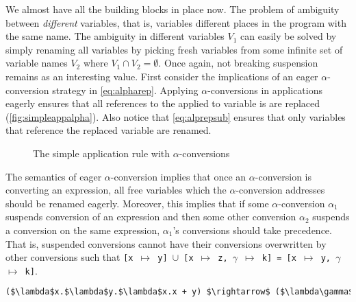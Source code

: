 \documentclass[11pt,oneside,a4paper]{report}
\begin{document}
We almost have all the building blocks in place now.
The problem of ambiguity between \textit{different} variables, that is, variables different places in the program with the same name.
The ambiguity in different variables $V_1$ can easily be solved by simply renaming all variables by picking fresh variables from some infinite set of variable names $V_2$ where $V_1 \cap V_2 = \emptyset$.
Once again, not breaking suspension remains as an interesting value.
First consider the implications of an eager $\alpha$-conversion strategy in \autoref{eq:alpharep}.
Applying $\alpha$-conversions in applications eagerly ensures that all references to the applied to variable is are replaced (\autoref{fig:simpleappalpha}).
Also notice that \autoref{eq:alprepsub} ensures that only variables that reference the replaced variable are renamed.
\begin{figure}[ht]
    \begin{mdframed}[style=style1]
        \vspace*{0.4cm}
          \begin{prooftree}
          \end{prooftree}   
    \end{mdframed}
    \caption{The simple application rule with $\alpha$-conversions}
    \label{fig:simpleappalpha}
\end{figure}
The semantics of eager $\alpha$-conversion implies that once an $\alpha$-conversion is converting an expression, all free variables which the $\alpha$-conversion addresses should be renamed eagerly.
Moreover, this implies that if some $\alpha$-conversion $\alpha_1$ suspends conversion of an expression and then some other conversion $\alpha_2$ suspends a conversion on the same expression, $\alpha_1$'s conversions should take precedence.
That is, suspended conversions cannot have their conversions overwritten by other conversions such that \texttt{[x $\mapsto$ y] $\cup$ [x $\mapsto$ z, $\gamma$ $\mapsto$ k] = [x $\mapsto$ y, $\gamma$ $\mapsto$ k]}.

\begin{lstlisting}[language=ML,caption={$\alpha$-conversion of a program with variable name collisions},label={lst:ambg},mathescape=true]
($\lambda$x.$\lambda$y.$\lambda$x.x + y) $\rightarrow$ ($\lambda\gamma$.$\lambda\theta$.$\lambda\sigma$.$\sigma$ + $\theta$)
\end{lstlisting}
\end{document}
